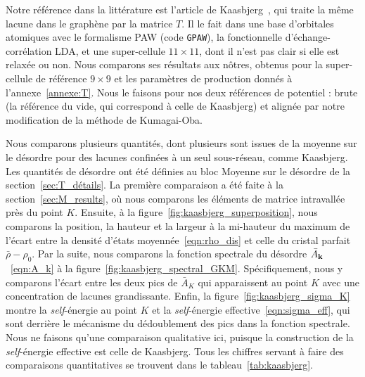 
Notre référence dans la littérature est l'article de Kaasbjerg~\cite{kaasbjergAtomisticMatrixTheory2020}, qui traite la même lacune dans le graphène par la matrice $T$. Il le fait dans une base d'orbitales atomiques avec le formalisme PAW (code \texttt{GPAW}), la fonctionnelle d'échange-corrélation LDA, et une super-cellule $11\times11$, dont il n'est pas clair si elle est relaxée ou non. Nous comparons ses résultats aux nôtres, obtenus pour la super-cellule de référence $9\times 9$ et les paramètres de production donnés à l'annexe~\ref{annexe:T}. Nous le faisons pour nos deux références de potentiel : brute (la référence du vide, qui correspond à celle de Kaasbjerg) et alignée par notre modification de la méthode de Kumagai-Oba.

Nous comparons plusieurs quantités, dont plusieurs sont issues de la moyenne sur le désordre pour des lacunes confinées à un seul sous-réseau, comme Kaasbjerg. Les quantités de désordre ont été définies au bloc \og Moyenne sur le désordre \fg{} de la section~\ref{sec:T_détails}. La première comparaison a été faite à la section~\ref{sec:M_results}, où nous comparons les éléments de matrice intravallée près du point $K$. Ensuite, à la figure~\ref{fig:kaasbjerg_superposition}, nous comparons la position, la hauteur et la largeur à la mi-hauteur du maximum de l'écart entre la densité d'états moyennée~\eqref{eqn:rho_dis} et celle du cristal parfait $\bar\rho -\rho_0$. Par la suite, nous comparons la fonction spectrale du désordre $\bar A_{\mathbf{k}}$~\eqref{eqn:A_k} à la figure~\ref{fig:kaasbjerg_spectral_GKM}. Spécifiquement, nous y comparons l'écart entre les deux pics de $\bar A_K$ qui apparaissent au point $K$ avec une concentration de lacunes grandissante. Enfin, la figure~\ref{fig:kaasbjerg_sigma_K} montre la \textit{self}-énergie au point $K$ et la \textit{self}-énergie effective~\eqref{eqn:sigma_eff}, qui sont derrière le mécanisme du dédoublement des pics dans la fonction spectrale. Nous ne faisons qu'une comparaison qualitative ici, puisque la construction de la \textit{self}-énergie effective est celle de Kaasbjerg. Tous les chiffres servant à faire des comparaisons quantitatives se trouvent dans le tableau~\ref{tab:kaasbjerg}.


